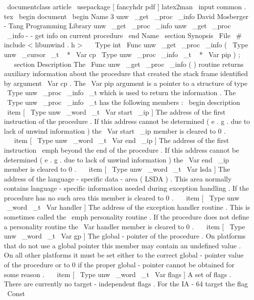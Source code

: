 \
documentclass
{
article
}
\
usepackage
[
fancyhdr
pdf
]
{
latex2man
}
\
input
{
common
.
tex
}
\
begin
{
document
}
\
begin
{
Name
}
{
3
}
{
unw
\
_get
\
_proc
\
_info
}
{
David
Mosberger
-
Tang
}
{
Programming
Library
}
{
unw
\
_get
\
_proc
\
_info
}
unw
\
_get
\
_proc
\
_info
-
-
get
info
on
current
procedure
\
end
{
Name
}
\
section
{
Synopsis
}
\
File
{
\
#
include
<
libunwind
.
h
>
}
\
\
\
Type
{
int
}
\
Func
{
unw
\
_get
\
_proc
\
_info
}
(
\
Type
{
unw
\
_cursor
\
_t
~
*
}
\
Var
{
cp
}
\
Type
{
unw
\
_proc
\
_info
\
_t
~
*
}
\
Var
{
pip
}
)
;
\
\
\
section
{
Description
}
The
\
Func
{
unw
\
_get
\
_proc
\
_info
}
(
)
routine
returns
auxiliary
information
about
the
procedure
that
created
the
stack
frame
identified
by
argument
\
Var
{
cp
}
.
The
\
Var
{
pip
}
argument
is
a
pointer
to
a
structure
of
type
\
Type
{
unw
\
_proc
\
_info
\
_t
}
which
is
used
to
return
the
information
.
The
\
Type
{
unw
\
_proc
\
_info
\
_t
}
has
the
following
members
:
\
begin
{
description
}
\
item
[
\
Type
{
unw
\
_word
\
_t
}
\
Var
{
start
\
_ip
}
]
The
address
of
the
first
instruction
of
the
procedure
.
If
this
address
cannot
be
determined
(
e
.
g
.
due
to
lack
of
unwind
information
)
the
\
Var
{
start
\
_ip
}
member
is
cleared
to
0
.
\
\
\
item
[
\
Type
{
unw
\
_word
\
_t
}
\
Var
{
end
\
_ip
}
]
The
address
of
the
first
instruction
\
emph
{
beyond
}
the
end
of
the
procedure
.
If
this
address
cannot
be
determined
(
e
.
g
.
due
to
lack
of
unwind
information
)
the
\
Var
{
end
\
_ip
}
member
is
cleared
to
0
.
\
\
\
item
[
\
Type
{
unw
\
_word
\
_t
}
\
Var
{
lsda
}
]
The
address
of
the
language
-
specific
data
-
area
(
LSDA
)
.
This
area
normally
contains
language
-
specific
information
needed
during
exception
handling
.
If
the
procedure
has
no
such
area
this
member
is
cleared
to
0
.
\
\
\
item
[
\
Type
{
unw
\
_word
\
_t
}
\
Var
{
handler
}
]
The
address
of
the
exception
handler
routine
.
This
is
sometimes
called
the
\
emph
{
personality
}
routine
.
If
the
procedure
does
not
define
a
personality
routine
the
\
Var
{
handler
}
member
is
cleared
to
0
.
\
\
\
item
[
\
Type
{
unw
\
_word
\
_t
}
\
Var
{
gp
}
]
The
global
-
pointer
of
the
procedure
.
On
platforms
that
do
not
use
a
global
pointer
this
member
may
contain
an
undefined
value
.
On
all
other
platforms
it
must
be
set
either
to
the
correct
global
-
pointer
value
of
the
procedure
or
to
0
if
the
proper
global
-
pointer
cannot
be
obtained
for
some
reason
.
\
\
\
item
[
\
Type
{
unw
\
_word
\
_t
}
\
Var
{
flags
}
]
A
set
of
flags
.
There
are
currently
no
target
-
independent
flags
.
For
the
IA
-
64
target
the
flag
\
Const
